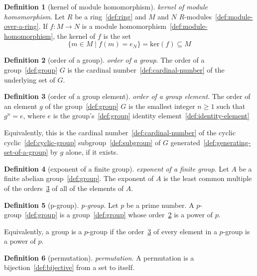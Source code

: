 \documentclass[12pt,a4paper]{article}
\theoremstyle{definition}
\newtheorem{definition}{Definition}
\begin{document}
\begin{definition}[kernel of module homomorphism]\label{def:kernel-of-module-homomorphism}
\emph{kernel of module homomorphism}. Let $R$ be a ring~\ref{def:ring} and $M$ and $N$ $R$-modules~\ref{def:module-over-a-ring}. If $f:M\to N$ is a module homomorphism~\ref{def:module-homomorphism}, the kernel of $f$ is the set $$\{m\in M\mid f(m) = e_N\}=\text{ker}(f)\subseteq M$$
\end{definition}

\begin{definition}[order of a group]\label{def:order-of-a-group}
\emph{order of a group}. The order of a group~\ref{def:group} $G$ is the cardinal number~\ref{def:cardinal-number} of the underlying set of $G$.
\end{definition}

\begin{definition}[order of a group element]\label{def:order-of-a-group-element}
\emph{order of a group element}. The order of an element $g$ of the group~\ref{def:group} $G$ is the smallest integer $n \geq 1$ such that $g^n = e$, where $e$ is the group's~\ref{def:group} identity element~\ref{def:identity-element}

Equivalently, this is the cardinal number~\ref{def:cardinal-number} of the cyclic cyclic~\ref{def:cyclic-group} subgroup~\ref{def:subgroup} of $G$ generated~\ref{def:generating-set-of-a-group} by $g$ alone, if it exists.
\end{definition}

\begin{definition}[exponent of a finite group]\label{def:exponent-of-a-finite-group}
\emph{exponent of a finite group}. Let $A$ be a finite abelian group~\ref{def:group}. The exponent of $A$ is the least common multiple of the orders~\ref{def:order-of-a-group-element} of all of the elements of $A$.
\end{definition}

\begin{definition}[p-group]\label{def:p-group}
\emph{p-group}. Let $p$ be a prime number. A $p$-group~\ref{def:group} is a group~\ref{def:group} whose order~\ref{def:order-of-a-group} is a power of $p$. 

Equivalently, a group is a $p$-group if the order~\ref{def:order-of-a-group-element} of every element in a $p$-group is a power of $p$.
\end{definition}

\begin{definition}[permutation]\label{def:permutation}
\emph{permutation}. A permutation is a bijection~\ref{def:bijective} from a set to itself.
\end{definition}
\end{document}
